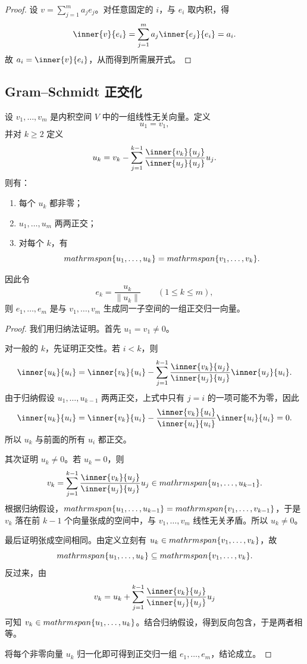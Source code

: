 \begin{proof}
设 $v=\sum_{j=1}^m a_je_j$。对任意固定的 $i$，与 $e_i$ 取内积，得
\[
\inner{v}{e_i}=\sum_{j=1}^m a_j\inner{e_j}{e_i}=a_i.
\]
故 $a_i=\inner{v}{e_i}$，从而得到所需展开式。
\end{proof}

\subsection{Gram--Schmidt 正交化}

\begin{theorem}
设 $v_1,\dots,v_m$ 是内积空间 $V$ 中的一组线性无关向量。定义
\[
u_1=v_1,
\]
并对 $k\ge 2$ 定义
\[
u_k=v_k-\sum_{j=1}^{k-1}\frac{\inner{v_k}{u_j}}{\inner{u_j}{u_j}}u_j.
\]
则有：
\begin{enumerate}[label=\textnormal{(\arabic*)}]
  \item 每个 $u_k$ 都非零；
  \item $u_1,\dots,u_m$ 两两正交；
  \item 对每个 $k$，有
  \[
  \\mathrm{span}\{u_1,\dots,u_k\}=\\mathrm{span}\{v_1,\dots,v_k\}.
  \]
\end{enumerate}
因此令
\[
e_k=\frac{u_k}{\|u_k\|}\qquad (1\le k\le m),
\]
则 $e_1,\dots,e_m$ 是与 $v_1,\dots,v_m$ 生成同一子空间的一组正交归一向量。
\end{theorem}

\begin{proof}
我们用归纳法证明。首先 $u_1=v_1\ne 0$。

对一般的 $k$，先证明正交性。若 $i<k$，则
\[
\inner{u_k}{u_i}
=\inner{v_k}{u_i}-\sum_{j=1}^{k-1}\frac{\inner{v_k}{u_j}}{\inner{u_j}{u_j}}\inner{u_j}{u_i}.
\]
由于归纳假设 $u_1,\dots,u_{k-1}$ 两两正交，上式中只有 $j=i$ 的一项可能不为零，因此
\[
\inner{u_k}{u_i}=\inner{v_k}{u_i}-\frac{\inner{v_k}{u_i}}{\inner{u_i}{u_i}}\inner{u_i}{u_i}=0.
\]
所以 $u_k$ 与前面的所有 $u_i$ 都正交。

其次证明 $u_k\ne 0$。若 $u_k=0$，则
\[
v_k=\sum_{j=1}^{k-1}\frac{\inner{v_k}{u_j}}{\inner{u_j}{u_j}}u_j\in \\mathrm{span}\{u_1,\dots,u_{k-1}\}.
\]
根据归纳假设，$\\mathrm{span}\{u_1,\dots,u_{k-1}\}=\\mathrm{span}\{v_1,\dots,v_{k-1}\}$，于是 $v_k$ 落在前 $k-1$ 个向量张成的空间中，与 $v_1,\dots,v_m$ 线性无关矛盾。所以 $u_k\ne 0$。

最后证明张成空间相同。由定义立刻有 $u_k\in \\mathrm{span}\{v_1,\dots,v_k\}$，故
\[
\\mathrm{span}\{u_1,\dots,u_k\}\subseteq \\mathrm{span}\{v_1,\dots,v_k\}.
\]
反过来，由
\[
v_k=u_k+\sum_{j=1}^{k-1}\frac{\inner{v_k}{u_j}}{\inner{u_j}{u_j}}u_j
\]
可知 $v_k\in \\mathrm{span}\{u_1,\dots,u_k\}$。结合归纳假设，得到反向包含，于是两者相等。

将每个非零向量 $u_k$ 归一化即可得到正交归一组 $e_1,\dots,e_m$，结论成立。
\end{proof}

